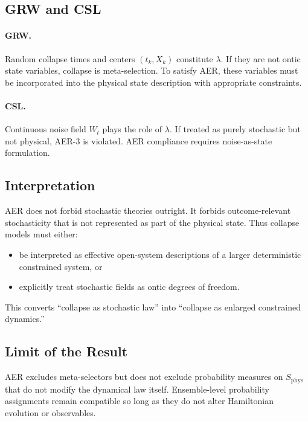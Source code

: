 \documentclass[11pt]{article}
\theoremstyle{remark}
\theoremstyle{plain}
\begin{document}
\subsection{GRW and CSL}

\paragraph{GRW.}
Random collapse times and centers $(t_k, X_k)$ 
constitute $\lambda$. If they are not ontic state variables, 
collapse is meta-selection. 
To satisfy AER, these variables must be incorporated 
into the physical state description with appropriate constraints.

\paragraph{CSL.}
Continuous noise field $W_t$ plays the role of $\lambda$. 
If treated as purely stochastic but not physical, AER-3 is violated.
AER compliance requires noise-as-state formulation.

\subsection{Interpretation}

AER does not forbid stochastic theories outright.
It forbids outcome-relevant stochasticity that is not represented 
as part of the physical state. 
Thus collapse models must either:

\begin{itemize}
\item be interpreted as effective open-system descriptions of a 
larger deterministic constrained system, or
\item explicitly treat stochastic fields as ontic degrees of freedom.
\end{itemize}

This converts ``collapse as stochastic law'' into 
``collapse as enlarged constrained dynamics.''

\subsection{Limit of the Result}

AER excludes meta-selectors but does not exclude 
probability measures on $S_{\mathrm{phys}}$ that do not 
modify the dynamical law itself. 
Ensemble-level probability assignments remain compatible 
so long as they do not alter Hamiltonian evolution or observables.
\end{document}
